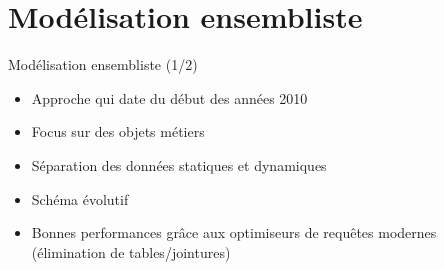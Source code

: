 \section[Modélisation ensembliste]{Modélisation ensembliste}
\begin{frame}{Modélisation ensembliste (1/2)}
	\begin{itemize}
	    \item Approche qui date du début des années 2010
        \item Focus sur des objets métiers
        \item Séparation des données statiques et dynamiques
        \item Schéma évolutif
        \item Bonnes performances grâce aux optimiseurs de requêtes modernes (élimination de tables/jointures)
	\end{itemize}
\end{frame}
